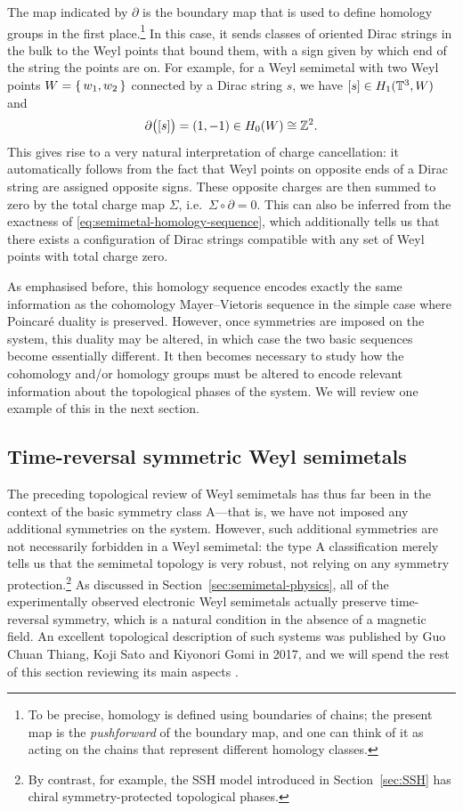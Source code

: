 The map indicated by $\partial$ is the boundary map that is used to define homology groups in the first place.\footnote{
	To be precise, homology is defined using boundaries of chains; the present map is the \emph{pushforward} of the boundary map, and one can think of it as acting on the chains that represent different homology classes.}
In this case, it sends classes of oriented Dirac strings in the bulk to the Weyl points that bound them, with a sign given by which end of the string the points are on. For example, for a Weyl semimetal with two Weyl points $W = \set{w_1,w_2}$ connected by a Dirac string $s$, we have $[s]\in H_1(\mathbb{T}^3,W)$ and
\begin{equation*}
	\partial\big([s]\big) = (1, -1)\in H_0(W)\cong\mathbb{Z}^2. 
\end{equation*}
This gives rise to a very natural interpretation of charge cancellation: it automatically follows from the fact that Weyl points on opposite ends of a Dirac string are assigned opposite signs. These opposite charges are then summed to zero by the total charge map $\Sigma$, i.e.\ $\Sigma\circ\partial = 0$. This can also be inferred from the exactness of \eqref{eq:semimetal-homology-sequence}, which additionally tells us that there exists a configuration of Dirac strings compatible with any set of Weyl points with total charge zero.

As emphasised before, this homology sequence encodes exactly the same information as the cohomology Mayer--Vietoris sequence in the simple case where Poincaré duality is preserved. However, once symmetries are imposed on the system, this duality may be altered, in which case the two basic sequences become essentially different. It then becomes necessary to study how the cohomology and/or homology groups must be altered to encode relevant information about the topological phases of the system. We will review one example of this in the next section.


\subsection{Time-reversal symmetric Weyl semimetals}\label{sec:T-WSMs}

The preceding topological review of Weyl semimetals has thus far been in the context of the basic symmetry class A---that is, we have not imposed any additional symmetries on the system. However, such additional symmetries are not necessarily forbidden in a Weyl semimetal: the type A classification merely tells us that the semimetal topology is very robust, not relying on any symmetry protection.\footnote{
	By contrast, for example, the SSH model introduced in Section~\ref{sec:SSH} has chiral symmetry-protected topological phases.}
As discussed in Section~\ref{sec:semimetal-physics}, all of the experimentally observed electronic Weyl semimetals actually preserve time-reversal symmetry, which is a natural condition in the absence of a magnetic field. An excellent topological description of such systems was published by Guo Chuan Thiang, Koji Sato and Kiyonori Gomi in 2017, and we will spend the rest of this section reviewing its main aspects \cite{Thiang_equivariant}.

